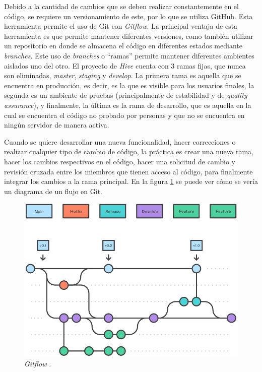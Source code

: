     Debido a la cantidad de cambios que se deben realizar constantemente en el código, se requiere un versionamiento de este, por lo que se utiliza GitHub. Esta herramienta permite el uso de Git con \textit{Gitflow}. La principal ventaja de esta herramienta es que permite mantener diferentes versiones, como también utilizar un repositorio en donde se almacena el código en diferentes estados mediante \textit{branches}. Este uso de \textit{branches} o ``ramas'' permite mantener diferentes ambientes aislados uno del otro. El proyecto de \textit{Hive} cuenta con 3 ramas fijas, que nunca son eliminadas, \textit{master}, \textit{staging} y \textit{develop}. La primera rama es aquella que se encuentra en producción, es decir, es la que es visible para los usuarios finales, la segunda es un ambiente de pruebas (principalmente de estabilidad y de \textit{quality assurance}), y finalmente, la última es la rama de desarrollo, que es aquella en la cual se encuentra el código no probado por personas y que no se encuentra en ningún servidor de manera activa. 
    
    Cuando se quiere desarrollar una nueva funcionalidad, hacer correcciones o realizar cualquier tipo de cambio de código, la práctica es crear una nueva rama, hacer los cambios respectivos en el código, hacer una solicitud de cambio y revisión cruzada entre los miembros que tienen acceso al código, para finalmente integrar los cambios a la rama principal. En la figura \ref{fig:gitflow_diagram} se puede ver cómo se vería un diagrama de un flujo en Git.
    
    \begin{figure}
        \centering
        \includegraphics[width=0.65\linewidth]{figures/gitflow.png}
        \caption{\textit{Gitflow} \protect\cite{gitflow_diagram}.}
        \label{fig:gitflow_diagram}
    \end{figure}
    
